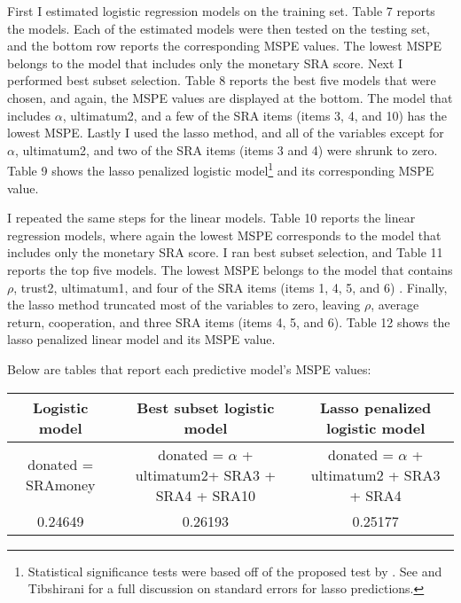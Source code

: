 \documentclass[12pt]{article}
\begin{document}
First I estimated logistic regression models on the training set. Table 7 reports the models. Each of the estimated models were then tested on the testing set, and the bottom row reports the corresponding MSPE values. The lowest MSPE belongs to the model that includes only the monetary SRA score. Next I performed best subset selection. Table 8 reports the best five models that were chosen, and again, the MSPE values are displayed at the bottom. The model that includes \(\alpha\), ultimatum2, and a few of the SRA items (items 3, 4, and 10) has the lowest MSPE. Lastly I used the lasso method, and all of the variables except for \(\alpha\), ultimatum2, and two of the SRA items (items 3 and 4) were shrunk to zero. Table 9 shows the lasso penalized logistic model\footnote{Statistical significance tests were based off of the proposed test by \cite{lockhart_2014}. See \cite{kyung_2010} and Tibshirani for a full discussion on standard errors for lasso predictions.} and its corresponding MSPE value.

I repeated the same steps for the linear models. Table 10 reports the linear regression models, where again the lowest MSPE corresponds to the model that includes only the monetary SRA score. I ran best subset selection, and Table 11 reports the top five models. The lowest MSPE belongs to the model that contains \(\rho\), trust2, ultimatum1, and four of the SRA items (items 1, 4, 5, and 6) . Finally, the lasso method truncated most of the variables to zero, leaving \(\rho\), average return, cooperation, and three SRA items (items 4, 5, and 6). Table 12 shows the lasso penalized linear model and its MSPE value.

Below are tables that report each predictive model\rq s MSPE values:
\onehalfspacing
\begin{center}
\begin{adjustbox}{width=\textwidth}
\begin{tabular}{ c | c | c }
\hline \hline
Logistic model & Best subset logistic model & Lasso penalized logistic model \\ 
\hline
\small donated = SRAmoney & donated = \(\alpha\) + ultimatum2+ SRA3 + SRA4 + SRA10 & donated = \(\alpha\) + ultimatum2 + SRA3 + SRA4 \\
 \hline
 0.24649 & 0.26193 & 0.25177 \\  
 \hline \hline
\end{tabular}
\end{adjustbox}
\end{center}
 
\end{document}
